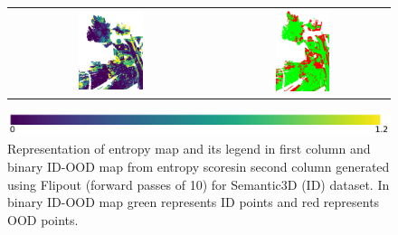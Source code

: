 \begin{figure}[h!]
\begin{tabular}{cc}
            \includegraphics[width=0.33\textwidth, height=0.18\textheight]{images/ood_imgs/fout_sem3d/fout_ent_3.pdf}& 
            \includegraphics[width=0.33\textwidth, height=0.18\textheight]{images/ood_imgs/fout_sem3d/fout_ent_ood_auroc_3.pdf}\\
        \end{tabular}
        \includegraphics[scale=0.45]{images/ent_legend.pdf}
        \caption{Representation of entropy map and its legend in first column and binary ID-OOD map from entropy scoresin second column generated using Flipout (forward passes of 10) for Semantic3D (ID) dataset. In binary ID-OOD map green represents ID points and red represents OOD points.}
        \label{fig:fout_ood_auroc_sem3d_ent}
    \end{figure}

